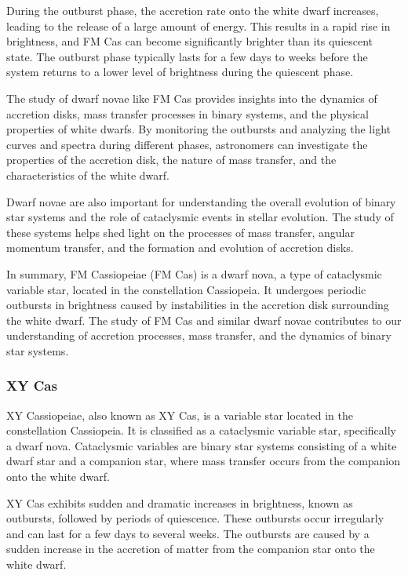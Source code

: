 During the outburst phase, the accretion rate onto the white dwarf increases, leading to the release of a large amount of energy. This results in a rapid rise in brightness, and FM Cas can become significantly brighter than its quiescent state. The outburst phase typically lasts for a few days to weeks before the system returns to a lower level of brightness during the quiescent phase.

The study of dwarf novae like FM Cas provides insights into the dynamics of accretion disks, mass transfer processes in binary systems, and the physical properties of white dwarfs. By monitoring the outbursts and analyzing the light curves and spectra during different phases, astronomers can investigate the properties of the accretion disk, the nature of mass transfer, and the characteristics of the white dwarf.

Dwarf novae are also important for understanding the overall evolution of binary star systems and the role of cataclysmic events in stellar evolution. The study of these systems helps shed light on the processes of mass transfer, angular momentum transfer, and the formation and evolution of accretion disks.

In summary, FM Cassiopeiae (FM Cas) is a dwarf nova, a type of cataclysmic variable star, located in the constellation Cassiopeia. It undergoes periodic outbursts in brightness caused by instabilities in the accretion disk surrounding the white dwarf. The study of FM Cas and similar dwarf novae contributes to our understanding of accretion processes, mass transfer, and the dynamics of binary star systems.


\subsubsection*{ XY Cas }
XY Cassiopeiae, also known as XY Cas, is a variable star located in the constellation Cassiopeia. It is classified as a cataclysmic variable star, specifically a dwarf nova. Cataclysmic variables are binary star systems consisting of a white dwarf star and a companion star, where mass transfer occurs from the companion onto the white dwarf.

XY Cas exhibits sudden and dramatic increases in brightness, known as outbursts, followed by periods of quiescence. These outbursts occur irregularly and can last for a few days to several weeks. The outbursts are caused by a sudden increase in the accretion of matter from the companion star onto the white dwarf.

